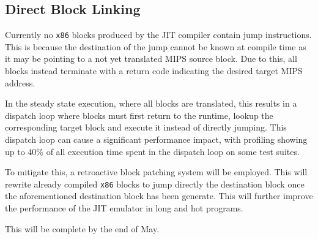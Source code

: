 \subsection{Direct Block Linking}

Currently no \texttt{x86} blocks produced by the JIT compiler contain jump instructions. This is because the destination of the jump cannot be known at compile time as it may be pointing to a not yet translated MIPS source block. Due to this, all blocks instead terminate with a return code indicating the desired target MIPS address.

In the steady state execution, where all blocks are translated, this results in a dispatch loop where blocks must first return to the runtime, lookup the corresponding target block and execute it instead of directly jumping. This dispatch loop can cause a significant performance impact, with profiling showing up to 40\% of all execution time spent in the dispatch loop on some test suites.

To mitigate this, a retroactive block patching system will be employed. This will rewrite already compiled \texttt{x86} blocks to jump directly the destination block once the aforementioned destination block has been generate. This will further improve the performance of the JIT emulator in long and hot programs.

This will be complete by the end of May.